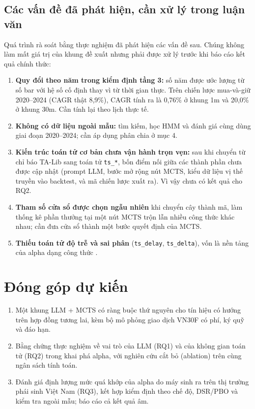 \documentclass[12pt,a4paper]{article}
\newcommand{\code}[1]{\texttt{#1}}
\begin{document}
\subsection{Các vấn đề đã phát hiện, cần xử lý trong luận văn}

Quá trình rà soát bằng thực nghiệm đã phát hiện các vấn đề sau. Chúng không làm mất giá trị của khung đề xuất nhưng phải được xử lý trước khi báo cáo kết quả chính thức:
\begin{enumerate}
  \item \textbf{Quy đổi theo năm trong kiểm định tầng 3:} số năm được ước lượng từ số bar với hệ số cố định thay vì từ thời gian thực. Trên chiến lược mua-và-giữ 2020–2024 (CAGR thật 8,9\%), CAGR tính ra là 0,76\% ở khung 1m và 20,0\% ở khung 30m. Cần tính lại theo lịch thực tế.
  \item \textbf{Không có dữ liệu ngoài mẫu:} tìm kiếm, học HMM và đánh giá cùng dùng giai đoạn 2020–2024; cần áp dụng phân chia ở mục 4.
  \item \textbf{Kiến trúc toán tử cơ bản chưa vận hành trọn vẹn:} sau khi chuyển từ chỉ báo TA-Lib sang toán tử \code{ts\_*}, bốn điểm nối giữa các thành phần chưa được cập nhật (prompt LLM, bước mở rộng nút MCTS, kiểu dữ liệu vị thế truyền vào backtest, và mã chiến lược xuất ra). Vì vậy chưa có kết quả cho RQ2.
  \item \textbf{Tham số cửa sổ được chọn ngẫu nhiên} khi chuyển cây thành mã, làm thống kê phần thưởng tại một nút MCTS trộn lẫn nhiều công thức khác nhau; cần đưa cửa sổ thành một bước quyết định của MCTS.
  \item \textbf{Thiếu toán tử độ trễ và sai phân} (\code{ts\_delay}, \code{ts\_delta}), vốn là nền tảng của alpha dạng công thức \citep{kakushadze2016alphas}.
\end{enumerate}

\section{Đóng góp dự kiến}
\begin{enumerate}
  \item Một khung LLM + MCTS có ràng buộc thứ nguyên cho tín hiệu có hướng trên hợp đồng tương lai, kèm bộ mô phỏng giao dịch VN30F có phí, ký quỹ và đáo hạn.
  \item Bằng chứng thực nghiệm về vai trò của LLM (RQ1) và của không gian toán tử (RQ2) trong khai phá alpha, với nghiên cứu cắt bỏ (ablation) trên cùng ngân sách tính toán.
  \item Đánh giá định lượng mức quá khớp của alpha do máy sinh ra trên thị trường phái sinh Việt Nam (RQ3), kết hợp kiểm định theo chế độ, DSR/PBO và kiểm tra ngoài mẫu; báo cáo cả kết quả âm.
\end{enumerate}
\end{document}
